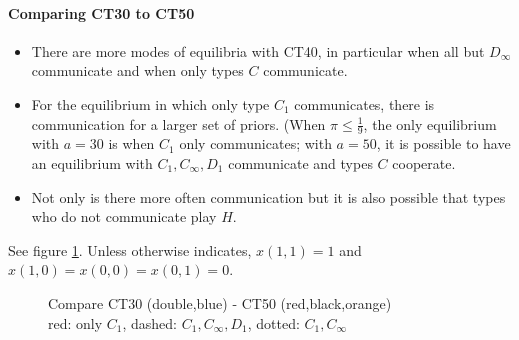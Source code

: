 \documentclass[12pt]{article}
\theoremstyle{definition}
\theoremstyle{remark}
\begin{document}
\paragraph{Comparing CT30 to CT50}
\begin{itemize}
    \item There are more modes of equilibria with CT40, in particular when all but $D_\infty$ communicate and when only types $C$ communicate.
    \item For the equilibrium in which only type $C_1$ communicates, there is communication for a larger set of priors. (When $\pi\leq \frac{1}{9}$, the only equilibrium with $a=30$ is when $C_1$ only communicates; with $a=50$, it is possible to have an equilibrium with $C_1,C_\infty,D_1$ communicate and types $C$ cooperate.
    \item Not only is there more often communication but it is also possible that types who do not communicate play $H$.
\end{itemize}
See figure \ref{fig:CT30-CT50}. Unless otherwise indicates, $x(1,1)=1$ and $x(1,0)=x(0,0)=x(0,1)=0$.

\begin{figure}[h]
	\centering
		   
		\caption{Compare CT30 (double,blue) - CT50 (red,black,orange)\\
			red: only $C_1$, dashed: $C_1,C_\infty,D_1$, dotted: $C_1,C_\infty$}
		\label{fig:CT30-CT50}
	\end{figure}
\end{document}
